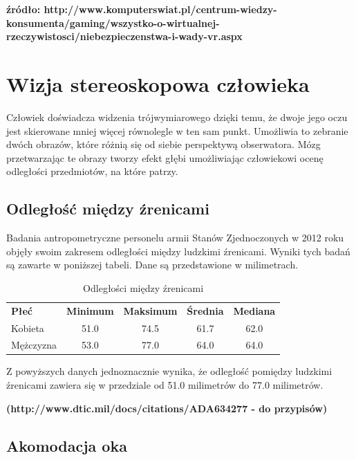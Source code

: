 \documentclass[a4paper,11pt,twoside]{report}
\theoremstyle{definition}
\begin{document}
\textbf {źródło: http://www.komputerswiat.pl/centrum-wiedzy-konsumenta/gaming/wszystko-o-wirtualnej-rzeczywistosci/niebezpieczenstwa-i-wady-vr.aspx }

\section {Wizja stereoskopowa człowieka}

Człowiek doświadcza widzenia trójwymiarowego dzięki temu, że dwoje jego oczu jest skierowane mniej więcej równolegle w ten sam punkt. Umożliwia to zebranie dwóch obrazów, które różnią się od siebie perspektywą obserwatora. Mózg przetwarzając te obrazy tworzy efekt głębi umożliwiając człowiekowi ocenę odległości przedmiotów, na które patrzy.

\subsection {Odległość między źrenicami}

Badania antropometryczne personelu armii Stanów Zjednoczonych w 2012 roku objęły swoim zakresem odległości między ludzkimi źrenicami. Wyniki tych badań są zawarte w poniższej tabeli. Dane są przedstawione w milimetrach.

\begin{table}[h!]
\centering
\label{my-label}
\begin{tabular}{lcccc}
\textbf{Płeć} & \multicolumn{1}{l}{\textbf{Minimum}} & \multicolumn{1}{l}{\textbf{Maksimum}} & \multicolumn{1}{l}{\textbf{Średnia}} & \multicolumn{1}{l}{\textbf{Mediana}} \\
Kobieta       & 51.0                                 & 74.5                                  & 61.7                                 & 62.0                                 \\
Mężczyzna     & 53.0                                 & 77.0                                  & 64.0                                 & 64.0                                
\end{tabular}
\caption{Odległości między źrenicami}
\end{table}

Z powyższych danych jednoznacznie wynika, że odległość pomiędzy ludzkimi źrenicami zawiera się w przedziale od 51.0 milimetrów do 77.0 milimetrów.

\textbf{(http://www.dtic.mil/docs/citations/ADA634277 - do przypisów)}

\subsection {Akomodacja oka}
\end{document}
